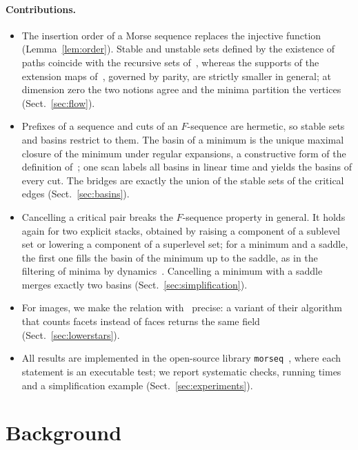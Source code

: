 \documentclass[runningheads]{llncs}
\newcommand{\morseq}{\texttt{morseq}\xspace}
\begin{document}
\paragraph{Contributions.}
\begin{itemize}
\item The insertion order of a Morse sequence replaces the injective
function (Lemma~\ref{lem:order}). Stable and unstable sets defined by the
existence of paths coincide with the recursive sets of~\cite{DFRS15},
whereas the supports of the extension maps of~\cite{Ber25a}, governed by
parity, are strictly smaller in general; at dimension zero the two notions
agree and the minima partition the vertices (Sect.~\ref{sec:flow}).
\item Prefixes of a sequence and cuts of an $F$-sequence are hermetic, so
stable sets and basins restrict to them. The basin of a minimum is the
unique maximal closure of the minimum under regular expansions, a
constructive form of the definition of~\cite{DFRS15}; one scan labels all
basins in linear time and yields the basins of every cut. The bridges are
exactly the union of the stable sets of the critical edges
(Sect.~\ref{sec:basins}).
\item Cancelling a critical pair breaks the $F$-sequence property in
general. It holds again for two explicit stacks, obtained by raising a
component of a sublevel set or lowering a component of a superlevel set;
for a minimum and a saddle, the first one fills the basin of the minimum up
to the saddle, as in the filtering of minima by
dynamics~\cite{Grimaud92}. Cancelling a minimum with a saddle merges
exactly two basins (Sect.~\ref{sec:simplification}).
\item For images, we make the relation with~\cite{RWS11} precise: a
variant of their algorithm that counts facets instead of faces returns the
same field (Sect.~\ref{sec:lowerstars}).
\item All results are implemented in the open-source library
\morseq~\cite{morseq}, where each statement is an executable test; we
report systematic checks, running times and a simplification example
(Sect.~\ref{sec:experiments}).
\end{itemize}

\section{Background}\label{sec:background}
\end{document}
